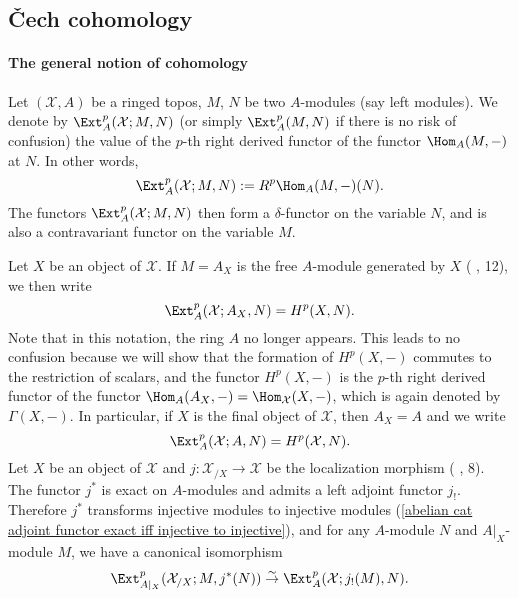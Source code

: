 \subsection{\v{C}ech cohomology}
\paragraph{The general notion of cohomology}\label{ringed topos cohomology def paragarph}
Let $(\mathcal{X},A)$ be a ringed topos, $M$, $N$ be two $A$-modules (say left modules). We denote by $\Ext_A^p(\mathcal{X};M,N)$ (or simply $\Ext_A^p(M,N)$ if there is no risk of confusion) the value of the $p$-th right derived functor of the functor $\Hom_A(M,-)$ at $N$. In other words,
\begin{equation}\label{ringed topos cohomology def-1}
\Ext_A^p(\mathcal{X};M,N):=R^p\Hom_A(M,-)(N).
\end{equation}
The functors $\Ext^p_A(\mathcal{X};M,N)$ then form a $\delta$-functor on the variable $N$, and is also a contravariant functor on the variable $M$.\par
Let $X$ be an object of $\mathcal{X}$. If $M=A_X$ is the free $A$-module generated by $X$ (\cite{SGA4-1} , 12), we then write
\begin{equation}\label{ringed topos cohomology def-2}
\Ext_A^p(\mathcal{X};A_X,N)=H^p(X,N).
\end{equation}
Note that in this notation, the ring $A$ no longer appears. This leads to no confusion because we will show that the formation of $H^p(X,-)$ commutes to the restriction of scalars, and the functor $H^p(X,-)$ is the $p$-th right derived functor of the functor $\Hom_A(A_X,-)=\Hom_\mathcal{X}(X,-)$, which is again denoted by $\Gamma(X,-)$. In particular, if $X$ is the final object of $\mathcal{X}$, then $A_X=A$ and we write
\[\Ext_A^p(\mathcal{X};A,N)=H^p(\mathcal{X},N).\]
Let $X$ be an object of $\mathcal{X}$ and $j:\mathcal{X}_{/X}\to \mathcal{X}$ be the localization morphism (\cite{SGA4-1} , 8). The functor $j^*$ is exact on $A$-modules and admits a left adjoint functor $j_!$. Therefore $j^*$ transforms injective modules to injective modules (\cref{abelian cat adjoint functor exact iff injective to injective}), and for any $A$-module $N$ and $A|_X$-module $M$, we have a canonical isomorphism
\begin{equation}\label{ringed topos Ext localization to object}
\Ext_{A|_X}^p(\mathcal{X}_{/X};M,j^*(N)) \stackrel{\sim}{\to } \Ext_A^p(\mathcal{X};j_!(M),N).
\end{equation}
